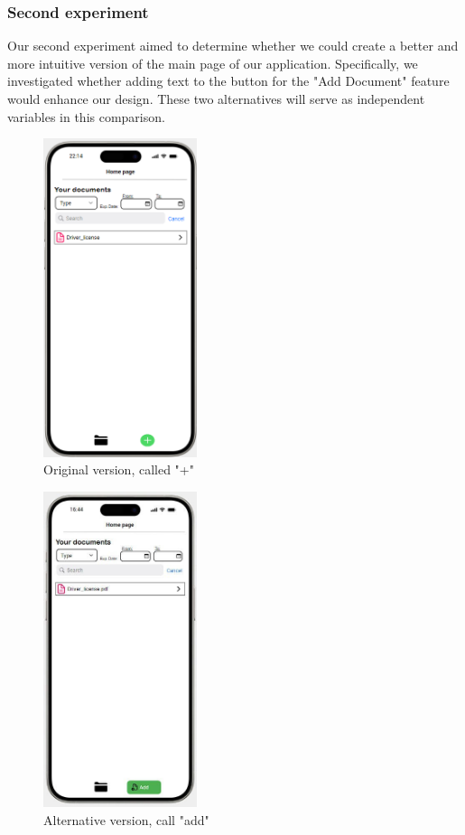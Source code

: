 		\subsubsection{Second experiment}
			Our second experiment aimed to determine whether we could create a better and more intuitive version of the main page of our application. Specifically, we investigated whether adding text to the button for the "Add Document" feature would enhance our design. These two alternatives will serve as independent variables in this comparison.
			\begin{figure}[htbp]
				\centering
				\includegraphics[width=0.4\textwidth]{../mockups/plus_variant.png}  %
				\caption{Original version, called "+"}
			\end{figure}
			\clearpage
			\begin{figure}[htbp]
				\centering
				\includegraphics[width=0.4\textwidth]{../mockups/add_variant.jpg}  %
				\caption{Alternative version, call "add"}
			\end{figure}
